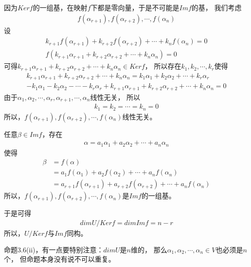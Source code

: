 \documentclass{article}
\begin{document}
因为$Kerf$的一组基，在映射$f$下都是零向量，于是不可能是$Imf$的基，
我们考虑
\begin{align*}
  f(\alpha_{r + 1}), f(\alpha_{r + 2}), \cdots, f(\alpha_n)
\end{align*}
设
\begin{align*}
  k_{r + 1} f(\alpha_{r + 1}) + k_{r + 2} f(\alpha_{r + 2}) + \cdots + k_n f(\alpha_n) = 0 \\
  f(k_{r + 1} \alpha_{r + 1} + k_{r + 2} \alpha_{r + 2} + \cdots + k_n \alpha_n) = 0
\end{align*}
可得$k_{r + 1} \alpha_{r + 1} + k_{r + 2} \alpha_{r + 2} + \cdots + k_n \alpha_n \in Kerf$，
所以存在$k_1, k_2, \cdots, k_r$使得
\begin{align*}
  k_{r + 1} \alpha_{r + 1} + k_{r + 2} \alpha_{r + 2} + \cdots + k_n \alpha_n = k_1 \alpha_1 + k_2 \alpha_2 + \cdots + k_r \alpha_r \\
  -k_1 \alpha_1 - k_2 \alpha_2 - \cdots - k_r \alpha_r + k_{r + 1} \alpha_{r + 1} + k_{r + 2} \alpha_{r + 2} + \cdots + k_n \alpha_n = 0
\end{align*}
由于$ \alpha_1, \alpha_2, \cdots, \alpha_r, \alpha_{r+1}, \cdots, \alpha_n$线性无关，
所以
\begin{align*}
  k_1 = k_2 = \cdots = k_n = 0
\end{align*}
所以，$f(\alpha_{r + 1}), f(\alpha_{r + 2}), \cdots, f(\alpha_n)$线性无关。

任意$\beta \in Imf$，存在
\begin{align*}
  \alpha = a_1 \alpha_1 + a_2 \alpha_2 + \cdots + a_n \alpha_n
\end{align*}
使得
\begin{align*}
  \beta & = f(\alpha)                                                                            \\
        & = a_1 f(\alpha_1) + a_2 f(\alpha_2) + \cdots + a_n f(\alpha_n)                         \\
        & = a_{r + 1} f(\alpha_{r + 1}) + a_{r + 2} f(\alpha_{r + 2}) + \cdots + a_n f(\alpha_n)
\end{align*}
所以，$f(\alpha_{r + 1}), f(\alpha_{r + 2}), \cdots, f(\alpha_n)$是$Imf$的一组基。

于是可得
\begin{align*}
  dim U/Kerf = dim Imf = n - r
\end{align*}
所以，$U/Kerf$与$Imf$同构。

\begin{zremark}
  命题3.6(ii)，有一点要特别注意：$dim U$是$n$维的，
  那么$\alpha_1, \alpha_2, \cdots, \alpha_n \in V$也必须是$n$个，
  但命题本身没有说不可以重复。
\end{zremark}
\end{document}
